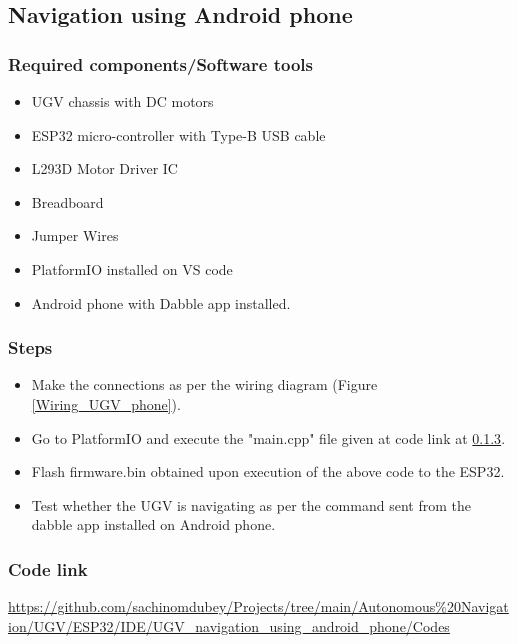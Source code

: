 \subsection{Navigation using Android phone} 
\subsubsection{Required components/Software tools}
\begin{itemize}
    \item  UGV chassis with DC motors
    \item  ESP32 micro-controller with Type-B USB cable
    \item  L293D Motor Driver IC
    \item  Breadboard
    \item  Jumper Wires
    \item  PlatformIO installed on VS code 
    \item  Android phone with Dabble app installed.
\end{itemize}


\subsubsection{Steps}
\begin{itemize}
    \item Make the connections as per the wiring diagram (Figure \ref{Wiring_UGV_phone}).
    \item Go to PlatformIO and execute the "main.cpp" file given at code link at \ref{Code_link_UGV_phone}.
    \item Flash firmware.bin obtained upon execution of the above code to the ESP32. 
    \item Test whether the UGV is navigating as per the command sent from the dabble app installed on Android phone.
\end{itemize}

\subsubsection{{Code link}}\label{Code_link_UGV_phone}
\begin{tcolorbox}
\url{https://github.com/sachinomdubey/Projects/tree/main/Autonomous\%20Navigation/UGV/ESP32/IDE/UGV_navigation_using_android_phone/Codes}
\end{tcolorbox}

